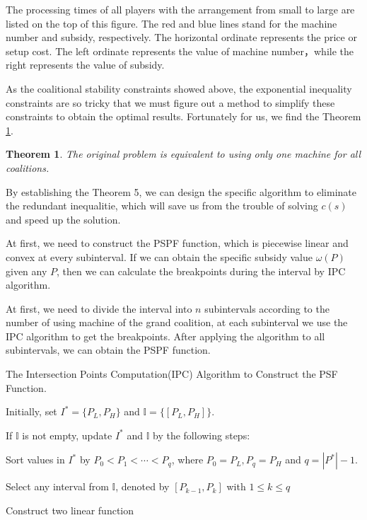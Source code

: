 \documentclass[UTF8]{article}
\newtheorem{thm}{\hspace{2em}Theorem}
\begin{document}
The processing times of all players with the arrangement from small to large are listed on the top of this figure.
The red and blue lines stand for the machine number and subsidy, respectively.
The horizontal ordinate represents the price or setup cost.
The left ordinate represents the value of machine number，while the right represents the value of subsidy.

As the coalitional stability constraints showed above, the exponential inequality constraints are so tricky that we must figure out a method to simplify these constraints to obtain the optimal results. Fortunately for us, we find the Theorem \ref{thm5}.


\begin{thm}\label{thm5}
The original problem is equivalent to using only one machine for all coalitions.

\end{thm}

By establishing the Theorem 5, we can design the specific algorithm to eliminate the redundant inequalitie, which will save us from the trouble of solving $c(s)$ and speed up the solution.

At first, we need to construct the PSPF function, which is piecewise linear and convex at every subinterval. If we can obtain the specific subsidy value $\omega(P)$ given any $P$, then we can calculate the breakpoints during the interval by IPC algorithm.

At first, we need to divide the interval into $n$ subintervals according to the  number of using machine of the grand coalition, at each subinterval we use the IPC algorithm to get the breakpoints. After applying the algorithm to all subintervals, we can obtain the PSPF function.


\begin{algorithm}[h]\label{algoIPC}
\caption{The Intersection Points Computation(IPC) Algorithm to Construct the PSF Function.}
\begin{algorithmic}[1]

\begin{description}
  \justifying
  \item[Step 1.] Initially, set $I^*=\{P_L,P_H\}$ and $\mathbb{I}= \{[P_L,P_H]\}$.
  \item[Step 2.] If $\mathbb{I}$ is not empty, update $I^*$ and $\mathbb{I}$ by the following steps:
  \item[Step 3.] Sort values in $I^*$ by $P_0<P_1<\cdots<P_q$, where $P_0 = P_L,P_q = P_H$ and $q = |P^*|-1$.
  \item[Step 4.]
  Select any interval from $\mathbb{I}$, denoted by $[P_{k-1},P_{k}]$ with $1\leq k \leq q$
  \item[Step 5.]
  Construct two linear function $ $
\end{description}

\end{algorithmic}
\end{algorithm}
\end{document}
